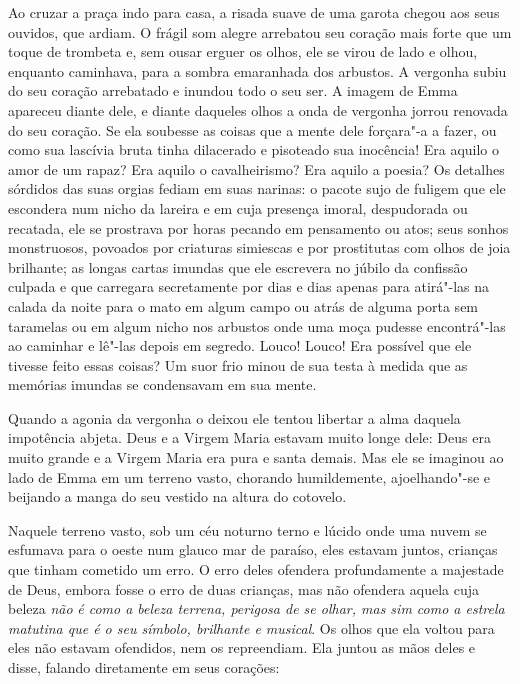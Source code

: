 Ao cruzar a praça indo para casa, a risada suave de uma garota chegou
aos seus ouvidos, que ardiam. O frágil som alegre arrebatou seu coração
mais forte que um toque de trombeta e, sem ousar erguer os olhos, ele
se virou de lado e olhou, enquanto caminhava, para a sombra emaranhada
dos arbustos. A vergonha subiu do seu coração arrebatado e inundou todo
o seu ser. A imagem de Emma apareceu diante dele, e diante daqueles
olhos a onda de vergonha jorrou renovada do seu coração. Se ela
soubesse as coisas que a mente dele forçara"-a a fazer, ou como sua
lascívia bruta tinha dilacerado e pisoteado sua inocência! Era aquilo o
amor de um rapaz? Era aquilo o cavalheirismo? Era aquilo a poesia? Os
detalhes sórdidos das suas orgias fediam em suas narinas: o pacote sujo
de fuligem que ele escondera num nicho da lareira e em cuja presença
imoral, despudorada  ou recatada, ele se prostrava por horas pecando em
pensamento ou atos; seus sonhos monstruosos, povoados por criaturas
simiescas e por prostitutas com olhos de joia brilhante; as longas
cartas imundas que ele escrevera no júbilo da confissão culpada e que
carregara secretamente por dias e dias apenas para atirá"-las na calada
da noite para o mato em algum campo ou atrás de alguma porta sem
taramelas ou em algum nicho nos arbustos onde uma moça pudesse
encontrá"-las ao caminhar e lê"-las depois em segredo. Louco! Louco! Era
possível que ele tivesse feito essas coisas? Um suor frio minou de sua
testa à medida que as memórias imundas se condensavam em sua mente.

Quando a agonia da vergonha o deixou ele tentou libertar a alma daquela
impotência abjeta. Deus e a Virgem Maria estavam muito longe dele: Deus
era muito grande e a Virgem Maria era pura e santa demais. Mas ele se
imaginou ao lado de Emma em um terreno vasto, chorando humildemente,
ajoelhando"-se e beijando a manga do seu vestido na altura do cotovelo.

Naquele terreno vasto, sob um céu noturno terno e lúcido onde uma nuvem
se esfumava para o oeste num glauco mar de paraíso, eles estavam
juntos, crianças que tinham cometido um erro. O erro deles ofendera
profundamente a majestade de Deus, embora fosse o erro de duas
crianças, mas não ofendera aquela cuja beleza \textit{não} \textit{é
como a beleza terrena, perigosa de se olhar, mas sim como a estrela
matutina que é o seu símbolo, brilhante e musical}. Os olhos que ela
voltou para eles não estavam ofendidos, nem os repreendiam. Ela juntou
as mãos deles e disse, falando diretamente em seus corações:

